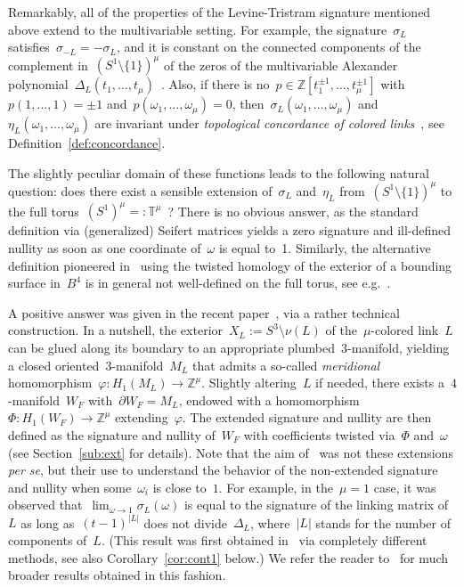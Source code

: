 \documentclass{amsart}
\newcommand{\Z}{\mathbb{Z}}
\newcommand{\T}{\mathbb{T}}
\theoremstyle{definition}
\theoremstyle{remark}
\begin{document}
Remarkably, all of the properties of the Levine-Tristram signature mentioned above extend to the multivariable setting.
For example, the signature~$\sigma_L$ satisfies~$\sigma_{-L}=-\sigma_L$, and it is constant on the connected components of the complement in~$(S^1\setminus\{1\})^\mu$ of the zeros of the multivariable Alexander polynomial~$\Delta_L(t_1,\dots,t_\mu)$~\cite{CF08}.
Also, if there is no~$p\in\Z[t_1^{\pm 1},\dots,t_\mu^{\pm 1}]$ with~$p(1,\dots,1)=\pm 1$ and~$p(\omega_1,\dots,\omega_\mu)=0$, then~$\sigma_L(\omega_1,\dots,\omega_\mu)$ and~$\eta_L(\omega_1,\dots,\omega_\mu)$
are invariant under {\em topological concordance of colored links\/}~\cite{CNT}, see Definition~\ref{def:concordance}.

\medskip

The slightly peculiar domain of these functions leads to the following natural question: does there exist a sensible extension
of~$\sigma_L$ and~$\eta_L$ from~$(S^1\setminus\{1\})^\mu$ to the full torus~$(S^1)^\mu=:\T^\mu$~?
There is no obvious answer, as the standard definition via (generalized) Seifert matrices yields a zero signature and ill-defined nullity as soon as one coordinate of~$\omega$ is equal to~1. Similarly, the alternative definition pioneered in~\cite{Viro} using the
twisted homology of the exterior of a bounding surface in~$B^4$ is in general not well-defined on the full torus, see e.g.~\cite[Section~4,4]{DFL}.

A positive answer was given in the recent paper~\cite{CMP23}, via a rather technical construction. In a nutshell, the exterior~$X_L:=S^3\setminus\nu(L)$ of the~$\mu$-colored link~$L$ can be glued
along its boundary to an appropriate plumbed~$3$-manifold, yielding a closed oriented~$3$-manifold~$M_L$ that admits a so-called {\em meridional\/} homomorphism~$\varphi\colon H_1(M_L)\to\Z^\mu$. Slightly altering~$L$ if needed, there exists a~$4$-manifold~$W_F$ with~$\partial W_F=M_L$,
endowed with a homomorphism~$\Phi\colon H_1(W_F)\to\Z^\mu$ extending~$\varphi$. The extended signature and nullity
are then defined as the signature and nullity of~$W_F$ with coefficients twisted via~$\Phi$ and~$\omega$ (see Section~\ref{sub:ext} for details).
Note that the aim of~\cite{CMP23} was not these extensions {\em per se\/}, but their
use to understand the behavior of the non-extended signature and nullity when some~$\omega_i$ is close to~$1$. For example, in the~$\mu=1$ case, it was observed that~$\lim_{\omega\to 1}\sigma_L(\omega)$
is equal to the signature of the linking matrix of~$L$ as long as~$(t-1)^{\vert L\vert}$ does not divide~$\Delta_L$, where~$\vert L\vert$ stands for the number of components of~$L$. (This result was first obtained in~\cite{BZ22} via completely different methods, see also Corollary~\ref{cor:cont1} below.)
We refer the reader to~\cite[Theorem~1.6]{CMP23} for much broader results obtained in this fashion.
\end{document}
